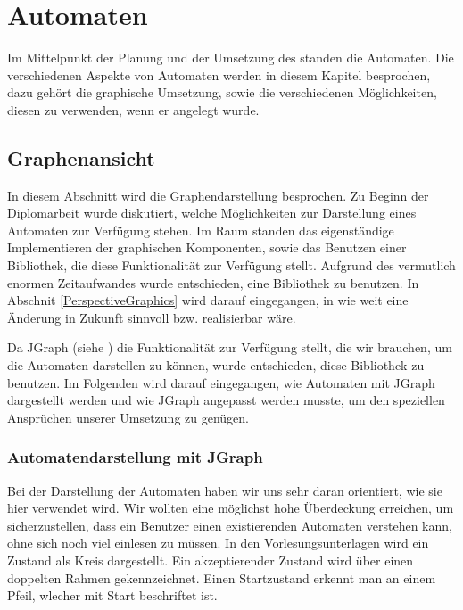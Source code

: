 

\chapter{Automaten}\label{Machines}

Im Mittelpunkt der Planung und der Umsetzung des \gtitools standen die Automaten.
Die verschiedenen Aspekte von Automaten werden in diesem Kapitel besprochen, dazu
gehört die graphische Umsetzung, sowie die verschiedenen Möglichkeiten, diesen zu
verwenden, wenn er angelegt wurde.\vspace{10pt}


\section{Graphenansicht}\label{Graph}

In diesem Abschnitt wird die Graphendarstellung besprochen. Zu Beginn der
Diplomarbeit wurde diskutiert, welche Möglichkeiten zur Darstellung eines
Automaten zur Verfügung stehen. Im Raum standen das eigenständige
Implementieren der graphischen Komponenten, sowie das Benutzen einer
Bibliothek, die diese Funktionalität zur Verfügung stellt. Aufgrund des
vermutlich enormen Zeitaufwandes wurde entschieden, eine Bibliothek zu benutzen.
In Abschnit \ref{PerspectiveGraphics} wird darauf eingegangen, in wie weit eine
Änderung in Zukunft sinnvoll bzw. realisierbar wäre.\vspace{10pt} 

Da JGraph (siehe \cite{jgraph}) die Funktionalität zur Verfügung stellt, die
wir brauchen, um die Automaten darstellen zu können, wurde entschieden, diese
Bibliothek zu benutzen. Im Folgenden wird darauf eingegangen, wie Automaten mit
JGraph dargestellt werden und wie JGraph angepasst werden musste, um den
speziellen Ansprüchen unserer Umsetzung zu genügen.\vspace{10pt}


\subsection{Automatendarstellung mit JGraph}\label{GraphJGraph}

Bei der Darstellung der Automaten haben wir uns sehr daran orientiert, wie sie
hier \cite{Sieber} verwendet wird. Wir wollten eine möglichst hohe Überdeckung
erreichen, um sicherzustellen, dass ein Benutzer einen existierenden Automaten
verstehen kann, ohne sich noch viel einlesen zu müssen. In den
Vorlesungsunterlagen wird ein Zustand als Kreis dargestellt. Ein akzeptierender
Zustand wird über einen doppelten Rahmen gekennzeichnet. Einen Startzustand
erkennt man an einem Pfeil, wlecher mit Start beschriftet ist.\vspace{10pt}

